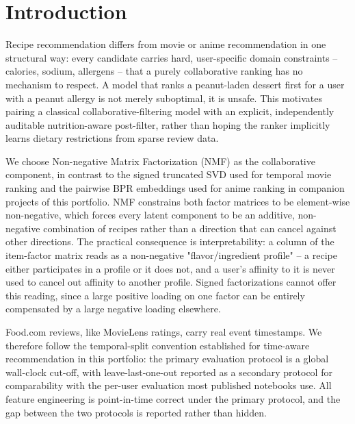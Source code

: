 \section{Introduction}
Recipe recommendation differs from movie or anime recommendation in one
structural way: every candidate carries hard, user-specific domain
constraints -- calories, sodium, allergens -- that a purely collaborative
ranking has no mechanism to respect. A model that ranks a peanut-laden
dessert first for a user with a peanut allergy is not merely suboptimal, it
is unsafe. This motivates pairing a classical collaborative-filtering model
with an explicit, independently auditable nutrition-aware post-filter,
rather than hoping the ranker implicitly learns dietary restrictions from
sparse review data.

We choose Non-negative Matrix Factorization (NMF) as the collaborative
component, in contrast to the signed truncated SVD used for temporal movie
ranking and the pairwise BPR embeddings used for anime ranking in companion
projects of this portfolio. NMF constrains both factor matrices to be
element-wise non-negative, which forces every latent component to be an
additive, non-negative combination of recipes rather than a direction that
can cancel against other directions. The practical consequence is
interpretability: a column of the item-factor matrix reads as a
non-negative "flavor/ingredient profile" -- a recipe either participates in
a profile or it does not, and a user's affinity to it is never used to
cancel out affinity to another profile. Signed factorizations cannot offer
this reading, since a large positive loading on one factor can be entirely
compensated by a large negative loading elsewhere.

Food.com reviews, like MovieLens ratings, carry real event timestamps. We
therefore follow the temporal-split convention established for time-aware
recommendation in this portfolio: the primary evaluation protocol is a
global wall-clock cut-off, with leave-last-one-out reported as a secondary
protocol for comparability with the per-user evaluation most published
notebooks use. All feature engineering is point-in-time correct under the
primary protocol, and the gap between the two protocols is reported rather
than hidden.

